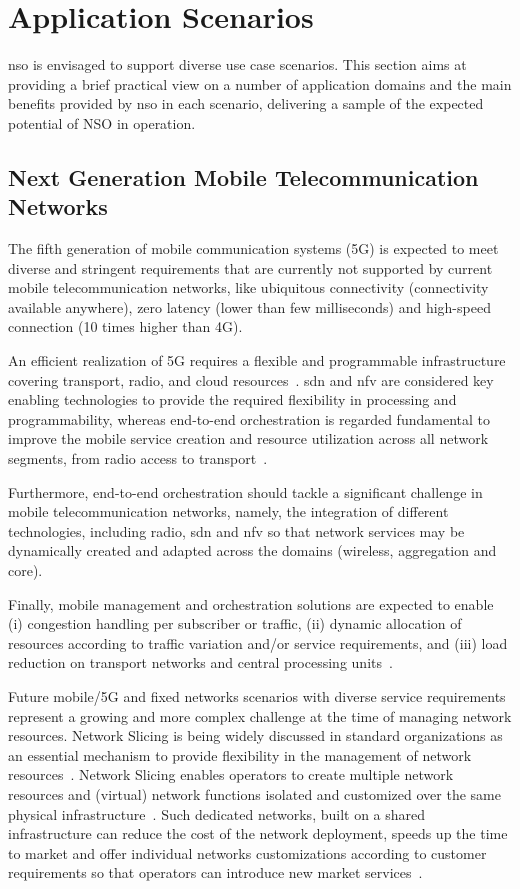 \section{Application Scenarios}
\label{sec:scneario}

\gls{nso} is envisaged to support diverse use case scenarios. This section aims at providing a brief practical view on a number of application domains and the main benefits provided by \gls{nso} in each scenario, delivering a sample of the expected potential of NSO in operation. 


\subsection{Next Generation Mobile Telecommunication Networks}

The fifth generation of mobile communication systems (5G) is expected to meet diverse and stringent requirements that are currently not supported by current mobile telecommunication networks, like ubiquitous connectivity (connectivity available anywhere), zero latency (lower than few milliseconds) and high-speed connection (10 times higher than 4G).

An efficient realization of 5G requires a flexible and programmable infrastructure covering transport, radio, and cloud resources~\cite{NGMN:5G:2017}. \gls{sdn} and \gls{nfv} are considered key enabling technologies to provide the required flexibility in processing and programmability, whereas end-to-end orchestration is regarded fundamental to improve the mobile service creation and resource utilization across all network segments, from radio access to transport~\cite{rostami-ran-transport-17}.

Furthermore, end-to-end orchestration should tackle  a significant challenge in mobile telecommunication networks, namely, the integration of different technologies, including radio, \gls{sdn} and \gls{nfv} so that network services may be dynamically created and adapted across the domains (wireless, aggregation and core). 

Finally, mobile management and orchestration solutions are expected to enable (i) congestion handling per subscriber or traffic, (ii) dynamic allocation of resources according to traffic variation and/or service requirements, and (iii) load reduction on transport networks and central processing units~\cite{EricssonInc.2015}. 

Future mobile/5G and fixed networks scenarios with diverse service requirements represent a growing and more complex challenge at the time of managing network resources. Network Slicing is being widely discussed in standard organizations as an essential mechanism to provide flexibility in the management of network resources~\cite{NGMN:5G:2017}. Network Slicing enables operators to create multiple network resources and (virtual) network functions isolated and customized over the same physical infrastructure~\cite{Galis:2018}. Such dedicated networks, built on a shared infrastructure can reduce the cost of the network deployment, speeds up the time to market and offer individual networks customizations according to customer requirements so that operators can introduce new market services~\cite{Devlic2017NESMO:Framework}. 


